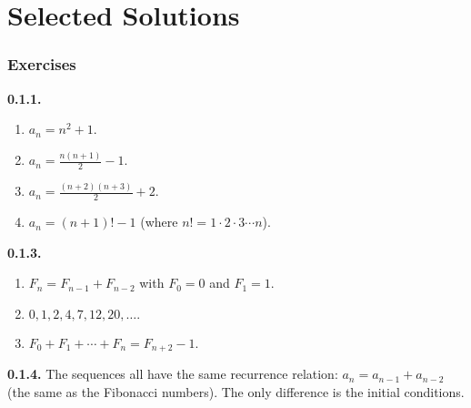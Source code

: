 \documentclass[12pt,]{book}
\theoremstyle{plain}
\theoremstyle{definition}
\theoremstyle{definition}
\theoremstyle{definition}
\numberwithin{equation}{chapter}
\begin{document}
\chapter[{Selected Solutions}]{Selected Solutions}\label{appendix-1}
\subsection*{ Exercises}
\noindent\textbf{0.1.1.} \hypertarget{p-79}{}%
\leavevmode%
\begin{enumerate}[label=(\alph*)]
\item\hypertarget{li-54}{}\(a_n = n^2 + 1\).%
\item\hypertarget{li-55}{}\(a_n = \frac{n(n+1)}{2} - 1\).%
\item\hypertarget{li-56}{}\(a_n = \frac{(n+2)(n+3)}{2} + 2\).%
\item\hypertarget{li-57}{}\(a_n = (n+1)! - 1\) (where \(n! = 1 \cdot 2 \cdot 3 \cdots n\)).%
\end{enumerate}
%
\par\smallskip
\noindent\textbf{0.1.3.} \hypertarget{p-90}{}%
\leavevmode%
\begin{enumerate}[label=(\alph*)]
\item\hypertarget{li-65}{}\(F_n = F_{n-1} + F_{n-2}\) with \(F_0 = 0\) and \(F_1 = 1\).%
\item\hypertarget{li-66}{}\(0, 1, 2, 4, 7, 12, 20, \ldots.\)%
\item\hypertarget{li-67}{}\(F_0 + F_1 + \cdots + F_n = F_{n+2} - 1.\)%
\end{enumerate}
%
\par\smallskip
\noindent\textbf{0.1.4.} \hypertarget{p-93}{}%
The sequences all have the same recurrence relation: \(a_n = a_{n-1} + a_{n-2}\) (the same as the Fibonacci numbers). The only difference is the initial conditions.%
\par\smallskip
\end{document}
